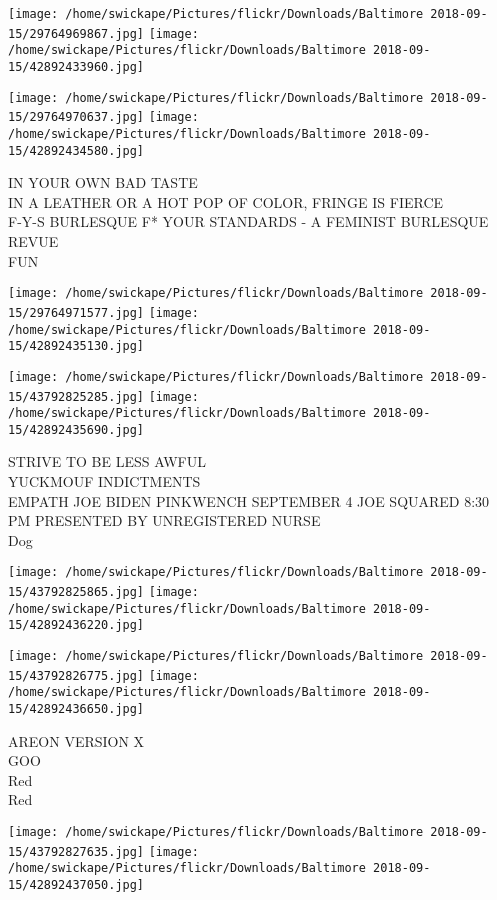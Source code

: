 \documentclass[10pt,letterpaper]{article}
\begin{document}
\texttt{[image: /home/swickape/Pictures/flickr/Downloads/Baltimore 2018-09-15/29764969867.jpg]}
\texttt{[image: /home/swickape/Pictures/flickr/Downloads/Baltimore 2018-09-15/42892433960.jpg]}

\texttt{[image: /home/swickape/Pictures/flickr/Downloads/Baltimore 2018-09-15/29764970637.jpg]}
\texttt{[image: /home/swickape/Pictures/flickr/Downloads/Baltimore 2018-09-15/42892434580.jpg]}

IN YOUR OWN BAD TASTE\\
IN A LEATHER OR A HOT POP OF COLOR, FRINGE IS FIERCE\\
F{-}Y{-}S BURLESQUE F* YOUR STANDARDS {-} A FEMINIST BURLESQUE REVUE\\
FUN
\pagebreak

\texttt{[image: /home/swickape/Pictures/flickr/Downloads/Baltimore 2018-09-15/29764971577.jpg]}
\texttt{[image: /home/swickape/Pictures/flickr/Downloads/Baltimore 2018-09-15/42892435130.jpg]}

\texttt{[image: /home/swickape/Pictures/flickr/Downloads/Baltimore 2018-09-15/43792825285.jpg]}
\texttt{[image: /home/swickape/Pictures/flickr/Downloads/Baltimore 2018-09-15/42892435690.jpg]}

STRIVE TO BE LESS AWFUL\\
YUCKMOUF INDICTMENTS\\
EMPATH JOE BIDEN PINKWENCH SEPTEMBER 4 JOE SQUARED 8:30 PM PRESENTED BY UNREGISTERED NURSE\\
Dog
\pagebreak

\texttt{[image: /home/swickape/Pictures/flickr/Downloads/Baltimore 2018-09-15/43792825865.jpg]}
\texttt{[image: /home/swickape/Pictures/flickr/Downloads/Baltimore 2018-09-15/42892436220.jpg]}

\texttt{[image: /home/swickape/Pictures/flickr/Downloads/Baltimore 2018-09-15/43792826775.jpg]}
\texttt{[image: /home/swickape/Pictures/flickr/Downloads/Baltimore 2018-09-15/42892436650.jpg]}

AREON VERSION X\\
GOO\\
Red\\
Red
\pagebreak

\texttt{[image: /home/swickape/Pictures/flickr/Downloads/Baltimore 2018-09-15/43792827635.jpg]}
\texttt{[image: /home/swickape/Pictures/flickr/Downloads/Baltimore 2018-09-15/42892437050.jpg]}
\end{document}
